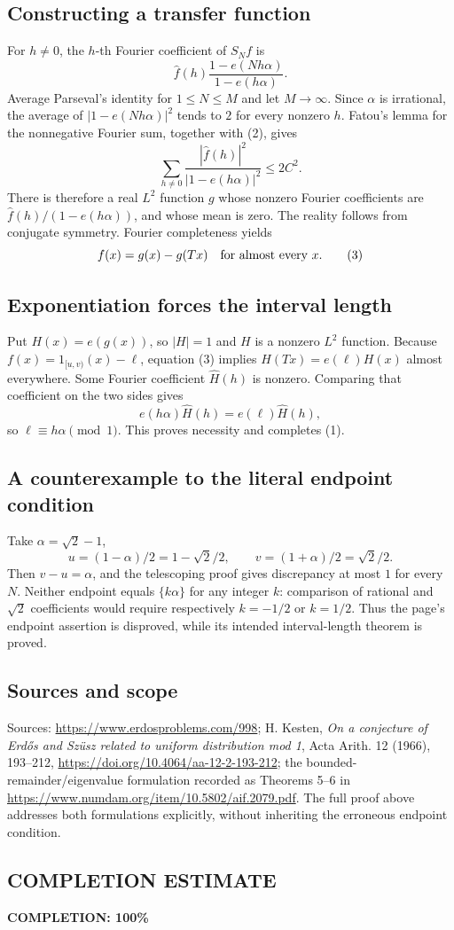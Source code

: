 \subsection*{Constructing a transfer function}
For $h\ne0$, the $h$-th Fourier coefficient of $S_Nf$ is
\[
 \widehat f(h)\frac{1-e(Nh\alpha)}{1-e(h\alpha)}.
\]
Average Parseval's identity for $1\le N\le M$ and let $M\to\infty$. Since $\alpha$ is irrational,
the average of $|1-e(Nh\alpha)|^2$ tends to $2$ for every nonzero $h$.
Fatou's lemma for the nonnegative Fourier sum, together with (2), gives
\[
 \sum_{h\ne0}\frac{|\widehat f(h)|^2}{|1-e(h\alpha)|^2}\le2C^2.
\]
There is therefore a real $L^2$ function $g$ whose nonzero Fourier coefficients are
$\widehat f(h)/(1-e(h\alpha))$, and whose mean is zero.
The reality follows from conjugate symmetry. Fourier completeness yields
\[
 f(x)=g(x)-g(Tx)\quad\hbox{for almost every }x.
 \tag{3}
\]

\subsection*{Exponentiation forces the interval length}
Put $H(x)=e(g(x))$, so $|H|=1$ and $H$ is a nonzero $L^2$ function.
Because $f(x)=1_{[u,v)}(x)-\ell$, equation (3) implies
$H(Tx)=e(\ell)H(x)$ almost everywhere.
Some Fourier coefficient $\widehat H(h)$ is nonzero. Comparing that coefficient on the two sides gives
\[
 e(h\alpha)\widehat H(h)=e(\ell)\widehat H(h),
\]
so $\ell\equiv h\alpha\pmod1$. This proves necessity and completes (1).

\subsection*{A counterexample to the literal endpoint condition}
Take $\alpha=\sqrt2-1$,
\[
 u=(1-\alpha)/2=1-\sqrt2/2,\qquad v=(1+\alpha)/2=\sqrt2/2.
\]
Then $v-u=\alpha$, and the telescoping proof gives discrepancy at most $1$ for every $N$.
Neither endpoint equals $\{k\alpha\}$ for any integer $k$: comparison of rational and $\sqrt2$ coefficients would require respectively $k=-1/2$ or $k=1/2$.
Thus the page's endpoint assertion is disproved, while its intended interval-length theorem is proved.

\subsection*{Sources and scope}
Sources: \url{https://www.erdosproblems.com/998}; H. Kesten, \emph{On a conjecture of Erd\H{o}s and Sz\"usz related to uniform distribution mod 1}, Acta Arith. 12 (1966), 193--212, \url{https://doi.org/10.4064/aa-12-2-193-212}; the bounded-remainder/eigenvalue formulation recorded as Theorems 5--6 in \url{https://www.numdam.org/item/10.5802/aif.2079.pdf}.
The full proof above addresses both formulations explicitly, without inheriting the erroneous endpoint condition.
\subsection*{COMPLETION ESTIMATE}
\textbf{COMPLETION: 100\%}
